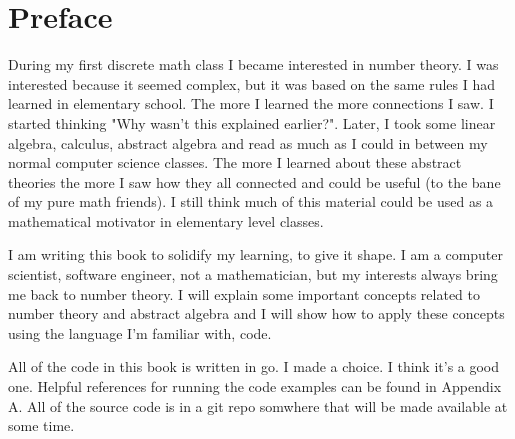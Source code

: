 \chapter{Preface}
During my first discrete math class I became interested in number theory. I was
interested because it seemed complex, but it was based on the same rules I had
learned in elementary school. The more I learned the more connections I 
saw. I started thinking "Why wasn't this explained earlier?". Later, I took some
linear algebra, calculus, abstract algebra and read as much as I could in
between my normal computer science classes. The more I learned about these
abstract theories the more I saw how they all connected and could be useful
(to the bane of my pure math friends). I still think much of this material could
be used as a mathematical motivator in elementary level classes.

I am writing this book to solidify my learning, to give it shape. I am a 
computer scientist, software engineer, not a mathematician, but my interests
always bring me back to number theory. I will explain some important concepts
related to number theory and abstract algebra and I will show how to apply
these concepts using the language I'm familiar with, code.

All of the code in this book is written in go. I made a choice. I think it's a
good one. Helpful references for running the code examples can be found in
Appendix A. All of the source code is in a git repo somwhere that will be made
available at some time.


